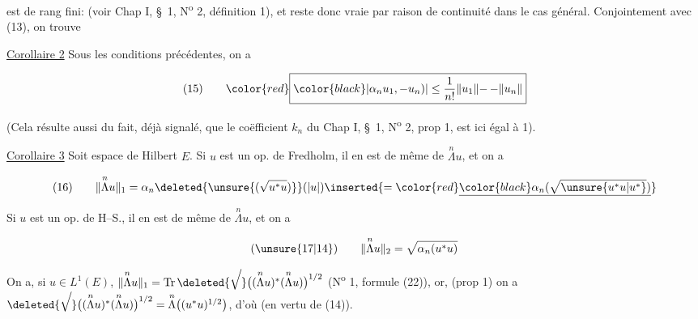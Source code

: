 est de rang fini:  (voir Chap I, \S~1, N\textsuperscript{o} 2, définition 1), et reste donc vraie par raison de continuité dans le cas général. Conjointement avec (13), on trouve

{\reversemarginpar{}}
\uline{Corollaire 2} Sous les conditions précédentes, on a

\[
\begin{array}{@{}l@{\qquad}l@{}}
(15) & {\color{red}\boxed{{\color{black}\displaystyle |\alpha_n u_1,\mathord{-}u_n)|\leq\frac1{n!}\lVert u_1\rVert\mathord{-}\,\mathord{-}\lVert u_n\rVert}}}
\end{array}
\]

(Cela résulte aussi du fait, déjà signalé, que le coëfficient $k_n$ du Chap I, \S~1, N\textsuperscript{o} 2, prop 1, est ici égal à 1).

{\reversemarginpar{}}
\uline{Corollaire 3} Soit   espace de Hilbert $E$.  Si $u$ est un op. de Fredholm, il en est de même de $\overset{n}{\Lambda}u$, et on a

\[
\begin{array}{@{}l@{\qquad}l@{}}
(16) & \displaystyle \lVert\overset{n}{\Lambda}u\rVert_1=\alpha_n\deleted{\unsure{(\sqrt{u^*u})}}(|u|)\inserted{={\color{red}\underline{{\color{black}\alpha_n(\sqrt{\unsure{u^*u|u^*}})}}}}
\end{array}
\]

Si $u$ est un op. de H--S., il en est de même de $\overset{n}{\Lambda}u$, et on a

\[
\begin{array}{@{}l@{\qquad}l@{}}
(\unsure{17|14}) & \displaystyle \lVert\overset{n}{\Lambda}u\rVert_2=\sqrt{\alpha_n(u^*u)}
\end{array}
\]

On a, si $u\in L^1(E)$, $\lVert\overset{n}{\Lambda}u\rVert_1=\operatorname{Tr}\deleted{\sqrt{\vphantom{(\overset{n}{\Lambda}u)^*}}}\bigl((\overset{n}{\Lambda}u)^*(\overset{n}{\Lambda}u)\bigr)^{1/2}$ (N\textsuperscript{o} 1, formule (22)), or, (prop 1) on a $\deleted{\sqrt{\vphantom{(\overset{n}{\Lambda}u)^*}}}\bigl((\overset{n}{\Lambda}u)^*(\overset{n}{\Lambda}u)\bigr)^{1/2}=\overset{n}{\Lambda}\bigl((u^*u)^{1/2}\bigr)$, d'où   (en vertu de (14)).


